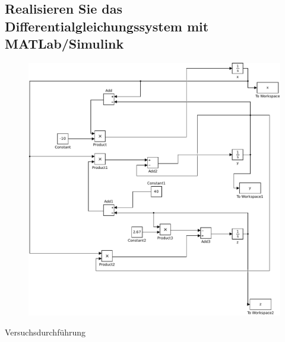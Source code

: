 \documentclass[10pt,a4paper]{article}
\begin{document}
\subsection{Realisieren Sie das Differentialgleichungssystem mit MATLab/Simulink}
\begin{figure}[h]
\centering
\includegraphics[width=0.9\linewidth]{../screenshots/3}
\end{figure}

\begin{center}
\begin{large}
Versuchsdurchführung
\end{large}
\end{center}
\end{document}
